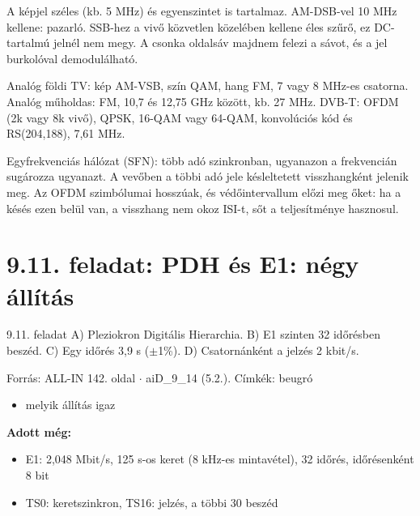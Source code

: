 A képjel széles (kb. 5 MHz) és egyenszintet is tartalmaz. AM-DSB-vel 10 MHz kellene: pazarló. SSB-hez a vivő közvetlen közelében kellene éles szűrő, ez DC-tartalmú jelnél nem megy. A csonka oldalsáv majdnem felezi a sávot, és a jel burkolóval demodulálható.

Analóg földi TV: kép AM-VSB, szín QAM, hang FM, 7 vagy 8 MHz-es csatorna. Analóg műholdas: FM, 10,7 és 12,75 GHz között, kb. 27 MHz. DVB-T: OFDM (2k vagy 8k vivő), QPSK, 16-QAM vagy 64-QAM, konvolúciós kód és RS(204,188), 7,61 MHz.

Egyfrekvenciás hálózat (SFN): több adó szinkronban, ugyanazon a frekvencián sugározza ugyanazt. A vevőben a többi adó jele késleltetett visszhangként jelenik meg. Az OFDM szimbólumai hosszúak, és védőintervallum előzi meg őket: ha a késés ezen belül van, a visszhang nem okoz ISI-t, sőt a teljesítménye hasznosul.
\begin{eredmeny}

\begin{center}\end{center}
\end{eredmeny}


\section{\texorpdfstring{9.11. feladat: PDH és E1: négy állítás}{9.11. feladat: PDH és E1: négy állítás}}\label{ai9_11}
\setcounter{lepes}{0}
\begin{feladat}{9.11. feladat}
A) Pleziokron Digitális Hierarchia. B) E1 szinten 32 időrésben beszéd. C) Egy időrés 3,9 \textmu{}s ($\pm$1\%). D) Csatornánként a jelzés 2 kbit/s.

{\footnotesize\sffamily Forrás: ALL-IN 142. oldal $\cdot$ aiD\_9\_14 (5.2.). Címkék: beugró}
\end{feladat}
\begin{keresunk}
\begin{itemize}
\item melyik állítás igaz
\end{itemize}
\end{keresunk}
\begin{jeloles}
\par\smallskip\textbf{Adott még:}
\begin{itemize}
\item E1: 2,048 Mbit/s, 125 \textmu{}s-os keret (8 kHz-es mintavétel), 32 időrés, időrésenként 8 bit
\item TS0: keretszinkron, TS16: jelzés, a többi 30 beszéd
\end{itemize}
\end{jeloles}

